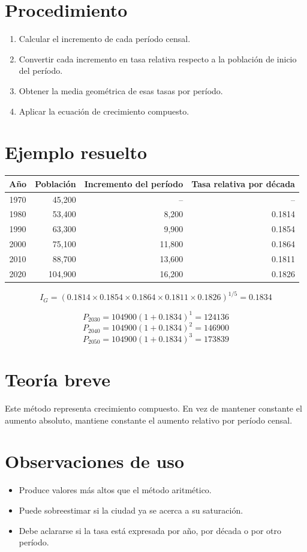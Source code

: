 \documentclass[12pt]{article}
\begin{document}
\section{Procedimiento}
\begin{enumerate}
\item Calcular el incremento de cada período censal.
\item Convertir cada incremento en tasa relativa respecto a la población de inicio del período.
\item Obtener la media geométrica de esas tasas por período.
\item Aplicar la ecuación de crecimiento compuesto.
\end{enumerate}

\section{Ejemplo resuelto}
\begin{center}
\begin{tabular}{crrr}
\toprule
Año & Población & Incremento del período & Tasa relativa por década \\
\midrule
1970 & 45,200 & -- & -- \\
1980 & 53,400 & 8,200 & 0.1814 \\
1990 & 63,300 & 9,900 & 0.1854 \\
2000 & 75,100 & 11,800 & 0.1864 \\
2010 & 88,700 & 13,600 & 0.1811 \\
2020 & 104,900 & 16,200 & 0.1826 \\
\bottomrule
\end{tabular}
\end{center}

\[
I_G=(0.1814\times0.1854\times0.1864\times0.1811\times0.1826)^{1/5}=0.1834
\]

\[
P_{2030}=\num{104900}(1+0.1834)^1=\num{124136}
\]
\[
P_{2040}=\num{104900}(1+0.1834)^2=\num{146900}
\]
\[
P_{2050}=\num{104900}(1+0.1834)^3=\num{173839}
\]


\section{Teoría breve}
Este método representa crecimiento compuesto. En vez de mantener constante el aumento absoluto, mantiene constante el aumento relativo por período censal.

\section{Observaciones de uso}
\begin{itemize}
\item Produce valores más altos que el método aritmético.
\item Puede sobreestimar si la ciudad ya se acerca a su saturación.
\item Debe aclararse si la tasa está expresada por año, por década o por otro período.
\end{itemize}
\end{document}
